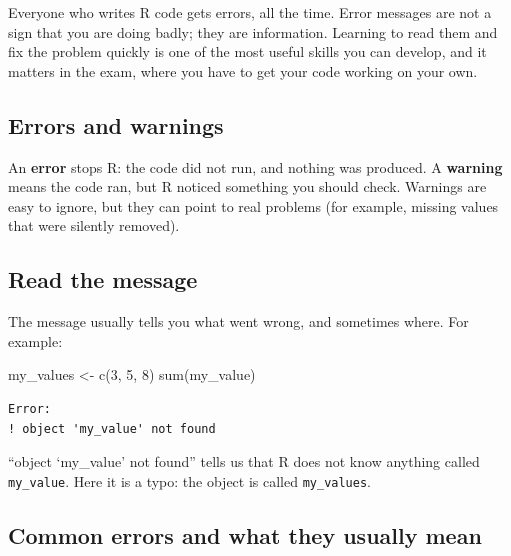 \documentclass[
  letterpaper,
  8pt,
  a4paper]{book}
\newenvironment{Shaded}{\begin{snugshade}}{\end{snugshade}}
\newcommand{\DecValTok}[1]{\textcolor[rgb]{0.68,0.00,0.00}{#1}}
\newcommand{\FunctionTok}[1]{\textcolor[rgb]{0.28,0.35,0.67}{#1}}
\newcommand{\NormalTok}[1]{\textcolor[rgb]{0.00,0.23,0.31}{#1}}
\newcommand{\OtherTok}[1]{\textcolor[rgb]{0.00,0.23,0.31}{#1}}
\begin{document}

Everyone who writes R code gets errors, all the time. Error messages are
not a sign that you are doing badly; they are information. Learning to
read them and fix the problem quickly is one of the most useful skills
you can develop, and it matters in the exam, where you have to get your
code working on your own.

\subsection*{Errors and warnings}\label{errors-and-warnings}

An \textbf{error} stops R: the code did not run, and nothing was
produced. A \textbf{warning} means the code ran, but R noticed something
you should check. Warnings are easy to ignore, but they can point to
real problems (for example, missing values that were silently removed).

\subsection*{Read the message}\label{read-the-message}

The message usually tells you what went wrong, and sometimes where. For
example:

\begin{Shaded}
\begin{Highlighting}[]
\NormalTok{my\_values }\OtherTok{\textless{}{-}} \FunctionTok{c}\NormalTok{(}\DecValTok{3}\NormalTok{, }\DecValTok{5}\NormalTok{, }\DecValTok{8}\NormalTok{)}
\FunctionTok{sum}\NormalTok{(my\_value)}
\end{Highlighting}
\end{Shaded}

\begin{verbatim}
Error:
! object 'my_value' not found
\end{verbatim}

``object `my\_value' not found'' tells us that R does not know anything
called \texttt{my\_value}. Here it is a typo: the object is called
\texttt{my\_values}.

\subsection*{Common errors and what they usually
mean}\label{common-errors-and-what-they-usually-mean}
\end{document}
